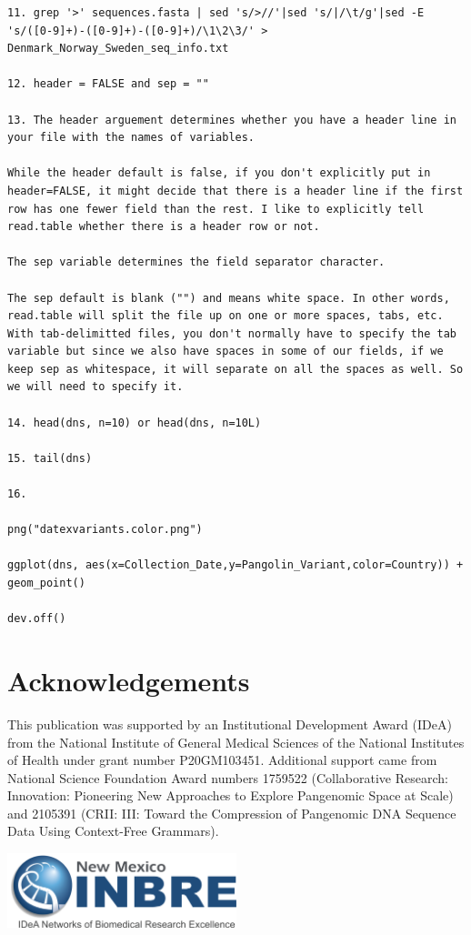 \documentclass[
]{book}
\begin{document}
\begin{verbatim}
11. grep '>' sequences.fasta | sed 's/>//'|sed 's/|/\t/g'|sed -E 's/([0-9]+)-([0-9]+)-([0-9]+)/\1\2\3/' > Denmark_Norway_Sweden_seq_info.txt

12. header = FALSE and sep = ""

13. The header arguement determines whether you have a header line in your file with the names of variables.

While the header default is false, if you don't explicitly put in header=FALSE, it might decide that there is a header line if the first row has one fewer field than the rest. I like to explicitly tell read.table whether there is a header row or not.

The sep variable determines the field separator character.

The sep default is blank ("") and means white space. In other words, read.table will split the file up on one or more spaces, tabs, etc. With tab-delimitted files, you don't normally have to specify the tab variable but since we also have spaces in some of our fields, if we keep sep as whitespace, it will separate on all the spaces as well. So we will need to specify it.

14. head(dns, n=10) or head(dns, n=10L)

15. tail(dns)

16.

png("datexvariants.color.png")

ggplot(dns, aes(x=Collection_Date,y=Pangolin_Variant,color=Country)) + geom_point()

dev.off()
\end{verbatim}

\hypertarget{acknowledgements}{%
\chapter{Acknowledgements}\label{acknowledgements}}

This publication was supported by an Institutional Development Award (IDeA) from the National Institute of General Medical Sciences of the National Institutes of Health under grant number P20GM103451. Additional support came from National Science Foundation Award numbers 1759522 (Collaborative Research: Innovation: Pioneering New Approaches to Explore Pangenomic Space at Scale) and 2105391 (CRII: III: Toward the Compression of Pangenomic DNA Sequence Data Using Context-Free Grammars).

\includegraphics[width=0.5\textwidth,height=\textheight]{./Figures/INBRE_Logo_Grad_transparent-2019.png}
\end{document}

